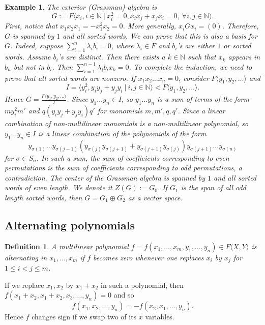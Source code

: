 \documentclass[10pt, a4paper]{article}
\newtheorem{defi}[thm]{Definition}
\newenvironment{noticeB}{%
  \tcolorbox[%
  notitle,
  empty,
  enhanced,  %
  breakable,
  coltext=black,
  colback=white, 
  fontupper=\rmfamily,
  noparskip,
  sharp corners,
  boxrule=-1pt,  %
  frame hidden,
  left=7pt,  %
  right=7pt,
  top=5pt,
  bottom=5pt,
  before skip=2.5ex plus 2pt,
  after skip=2.5ex plus 2pt,
  borderline west = {1.5pt}{-0.1pt}{blue!30!black}, %
  overlay unbroken and last={%
    \draw[color=black, line width=1.25pt]
    ($(frame.south west)+(1.pt, -0.1pt)$) -- ++(2em, 0);
  }
  ]}
{\endtcolorbox}
\newenvironment{definition}{\begin{noticeB}\begin{defi}}{%
    \end{defi}\end{noticeB}}
\newtheorem{example}[thm]{Example}
\newcommand{\N}{\mathbb {N}}
\begin{document}
\begin{example}
  The exterior (Grassman) algebra is 
  $$G := F \langle x_i, i \in \N\ |\ x_i ^2 = 0, x_i x_j + x_j x_i = 0,\ \forall i, j \in \N \rangle.$$
  First, notice that $x_1 x_2 x_1 = - x_1 ^2 x_2 = 0$. More generally, $x_i G x_i = (0)$.
  Therefore, $G$ is spanned by $1$ and all sorted words. We can prove that this is also a basis for $G$.
  Indeed, suppose $\sum_{i = 1} ^n \lambda_i b_i = 0$, where $\lambda_i \in F$ and $b_i$'s are either $1$ or sorted words.
  Assume $b_i$'s are distinct. Then there exists a $k \in \N$ such that $x_k$ appears in $b_n$ but not in $b_i$.
  Then $\sum_{i = 1} ^{n - 1} \lambda_i b_i x_k = 0$. To complete the induction, we need to prove that all sorted words are nonzero.
  If $x_1 x_2 \dots x_n = 0$, consider $F \langle y_1, y_2, \dots \rangle$ and 
  $$I = \langle y_i ^2, y_i y_j + y_j y_i\ |\ i, j \in \N \rangle \lhd F\langle y_1, y_2, \dots \rangle.$$
  Hence $G = \frac{F \langle y_1, y_2, \dots \rangle}{I}$. Since $y_1 \dots y_n \in I$,
  so $y_1 \dots y_n$ is a sum of terms of the form $m y_i ^2 m'$ and $q (y_i y_j + y_j y_i) q'$ for monomials $m, m', q, q'$.
  Since a linear combination of non-multilinear monomials is a non-multilinear polynomial, so $y_1 \dots y_n \in I$
  is a linear combination of the polynomials of the form 
  $$y_{\sigma(1)} \dots y_{\sigma(j - 1)} (y_{\sigma(j)} y_{\sigma(j+1)} + y_{\sigma(j + 1)} y_{\sigma(j)}) y_{\sigma(j + 1)} \dots y_{\sigma(n)}$$
  for $\sigma \in S_n$. In such a sum, the sum of coefficients corresponding to even permutations is the sum of coefficients corresponding 
  to odd permutations, a contradiction. The center of the Grassman algebra is spanned by $1$ and all sorted words of even length.
  We denote it $Z(G) := G_0$.  If $G_1$ is the span of all odd length sorted words, then $G = G_1 \oplus G_2$
  as a vector space.
\end{example}

\subsection{Alternating polynomials}

\begin{definition}
  A multilinear polynomial $f = f(x_1, \dots, x_m , y_1, \dots, y_n) \in F\langle X, Y\rangle$
  is alternating in $x_1, \dots, x_m$ if $f$ becomes zero whenever one replaces $x_i$ by $x_j$ for $1 \leq i < j \leq m$.
\end{definition}

If we replace $x_1, x_2$ by $x_1 + x_2$ in such a polynomial, then 
$f (x_1 + x_2, x_1 + x_2, x_3, \dots, y_n) = 0$ and so 
$$f(x_1, x_2, \dots, y_n) = - f(x_2, x_1, \dots, y_n).$$
Hence $f$ changes sign if we swap two of its $x$ variables.
\end{document}

